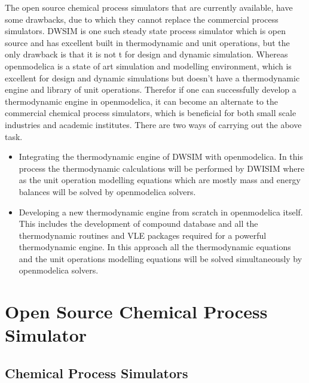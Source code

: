 \documentclass[12pt]{report}
\begin{document}
The open source chemical process simulators that are currently available, have some drawbacks, due to which they cannot replace the commercial process simulators. DWSIM is one such steady state process simulator which is open source and has excellent built in thermodynamic and unit operations, but the only drawback is that it is not t for design and dynamic simulation. Whereas openmodelica is a state of art simulation and modelling environment, which is excellent for design and dynamic simulations but doesn't have a thermodynamic engine and library of unit operations. Therefor if one can successfully develop a thermodynamic engine in openmodelica, it can become an alternate to the commercial chemical process simulators, which is beneficial for both small scale industries and academic institutes. There are two ways of carrying out the above task. 
\begin{itemize}
\item Integrating the thermodynamic engine of DWSIM with openmodelica. In this process the thermodynamic calculations will be performed by DWISIM where as the unit operation modelling equations which are mostly mass and energy balances will be solved by openmodelica solvers. 
\item Developing a new thermodynamic engine from scratch in openmodelica itself. This includes the development of compound database and all the thermodynamic routines and VLE packages required for a powerful thermodynamic engine. In this approach all the thermodynamic equations and the unit operations modelling equations will be solved simultaneously by openmodelica solvers.
\end{itemize}

\chapter{Open Source Chemical Process Simulator}

\section{Chemical Process Simulators}
\end{document}
